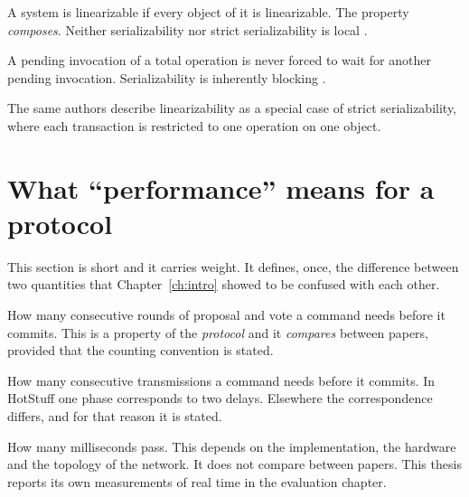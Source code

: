 \begin{description}[leftmargin=2.2em,style=nextline,font=\normalfont\bfseries]
  \item[Locality.] A system is linearizable if every object of it is
  linearizable. The property \emph{composes}. Neither serializability
  nor strict serializability is local
  \cite{herlihy1990linearizability}.
  \item[Nonblocking.] A pending invocation of a total operation is never
  forced to wait for another pending invocation. Serializability is
  inherently blocking \cite{herlihy1990linearizability}.
\end{description}

The same authors describe linearizability as a special case of strict
serializability, where each transaction is restricted to one operation
on one object.

\section{What \enquote{performance} means for a protocol}
\label{sec:performance}

This section is short and it carries weight. It defines, once, the
difference between two quantities that Chapter~\ref{ch:intro} showed to
be confused with each other.

\begin{description}[leftmargin=2.2em,style=nextline,font=\normalfont\bfseries]
  \item[Phases.] How many consecutive rounds of proposal and vote a
  command needs before it commits. This is a property of the
  \emph{protocol} and it \emph{compares} between papers, provided that
  the counting convention is stated.
  \item[Message delays.] How many consecutive transmissions a command
  needs before it commits. In HotStuff one phase corresponds to two
  delays. Elsewhere the correspondence differs, and for that reason it
  is stated.
  \item[Real time.] How many milliseconds pass. This depends on the
  implementation, the hardware and the topology of the network. It does
  not compare between papers. This thesis reports its own measurements
  of real time in the evaluation chapter.
\end{description}

